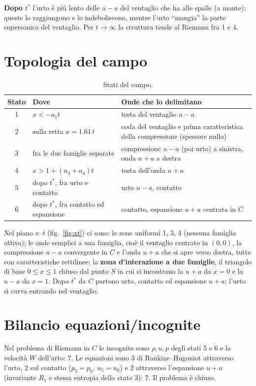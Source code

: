 \documentclass[11pt,a4paper]{article}
\newcommand{\uma}{u-a}
\newcommand{\upa}{u+a}
\begin{document}
\textbf{Dopo $t^*$} l'urto è più lento delle $\uma$ del ventaglio che ha alle spalle (a monte): queste lo
raggiungono e lo indeboliscono, mentre l'urto ``mangia'' la parte supersonica del ventaglio. Per $t\to\infty$
la struttura tende al Riemann fra 1 e 4.

\section{Topologia del campo}
\begin{table}[H]
  \centering
  \small
  \begin{tabular}{clp{8.2cm}}
    \toprule
    Stato & Dove & Onde che lo delimitano \\
    \midrule
    1 & $x<-a_1t$ & testa del ventaglio $\uma$ \\
    2 & sulla retta $x=\num{1.61}\,t$ & coda del ventaglio e prima caratteristica della compressione (spessore nullo) \\
    3 & fra le due famiglie separate & compressione $\uma$ (poi urto) a sinistra, onda $\upa$ a destra \\
    4 & $x>1+(u_4+a_4)t$ & testa dell'onda $\upa$ \\
    5 & dopo $t^*$, fra urto e contatto & urto $\uma$, contatto \\
    6 & dopo $t^*$, fra contatto ed espansione & contatto, espansione $\upa$ centrata in $C$ \\
    \bottomrule
  \end{tabular}
  \caption{Stati del campo.}
\end{table}
Nel piano $x$--$t$ (fig.~\ref{fig:xt}) ci sono: le zone uniformi 1, 3, 4 (nessuna famiglia attiva);
le onde semplici a una famiglia, cioè il ventaglio centrato in $(0,0)$, la compressione $\uma$ convergente in $C$
e l'onda $\upa$ che si apre verso destra, tutte con caratteristiche rettilinee; la \textbf{zona d'interazione a
due famiglie}, il triangolo di base $0\le x\le1$ chiuso dal punto $S$ in cui si incontrano la $\upa$ da $x=0$ e
la $\uma$ da $x=1$. Dopo $t^*$ da $C$ partono urto, contatto ed espansione $\upa$; l'urto si curva entrando nel
ventaglio.

\section{Bilancio equazioni/incognite}
Nel problema di Riemann in $C$ le incognite sono $\rho,u,p$ degli stati 5 e 6 e la velocità $W$ dell'urto: 7.
Le equazioni sono 3 di Rankine--Hugoniot attraverso l'urto, 2 sul contatto ($p_5=p_6$, $u_5=u_6$) e 2
attraverso l'espansione $\upa$ (invariante $R_1$ e stessa entropia dello stato 3): 7. Il problema è chiuso.
\end{document}
